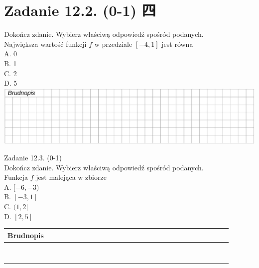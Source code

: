 \documentclass[10pt]{article}
\begin{document}
\section*{Zadanie 12.2. (0-1) 四}
Dokończ zdanie. Wybierz właściwą odpowiedź spośród podanych.\\
Największa wartość funkcji \(f\) w przedziale \([-4,1]\) jest równa\\
A. 0\\
B. 1\\
C. 2\\
D. 5\\
\includegraphics[max width=\textwidth, center]{2024_11_21_51cb67544fb9b029f01cg-12}

Zadanie 12.3. (0-1)\\
Dokończ zdanie. Wybierz właściwą odpowiedź spośród podanych.\\
Funkcja \(f\) jest malejąca w zbiorze\\
A. \([-6,-3)\)\\
B. \([-3,1]\)\\
C. \((1,2]\)\\
D. \([2,5]\)

\begin{center}
\begin{tabular}{|c|c|c|c|c|c|c|c|c|c|c|c|c|c|c|c|c|c|c|c|c|c|c|c|c|c|c|c|c|c|c|}
\hline
\multicolumn{5}{|l|}{Brudnopis} &  &  &  &  &  &  &  &  &  &  &  &  &  &  &  &  &  &  &  &  &  &  &  &  &  &  \\
\hline
 &  &  &  &  &  &  &  &  &  &  &  &  &  &  &  &  &  &  &  &  &  &  &  &  &  &  &  &  &  &  \\
\hline
 &  &  &  &  &  &  &  &  &  &  &  &  &  &  &  &  &  &  &  &  &  &  &  &  &  &  &  &  &  &  \\
\hline
 &  &  &  &  &  &  &  &  &  &  &  &  &  &  &  &  &  &  &  &  &  &  &  &  &  &  &  &  &  &  \\
\hline
 &  &  &  &  &  &  &  &  &  &  &  &  &  &  &  &  &  &  &  &  &  &  &  &  &  &  &  &  &  &  \\
\hline
 &  &  &  &  &  &  &  &  &  &  &  &  &  &  &  &  &  &  &  &  &  &  &  &  &  &  &  &  &  &  \\
\hline
 &  &  &  &  &  &  &  &  &  &  &  &  &  &  &  &  &  &  &  &  &  &  &  &  &  &  &  &  &  &  \\
\hline
 &  &  &  &  &  &  &  &  &  &  &  &  &  &  &  &  &  &  &  &  &  &  &  &  &  &  &  &  &  &  \\
\hline
 &  &  &  &  &  &  &  &  &  &  &  &  &  &  &  &  &  &  &  &  &  &  &  &  &  &  &  &  &  &  \\
\hline
\end{tabular}
\end{center}
\end{document}
